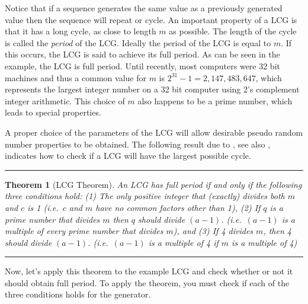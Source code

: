 \documentclass[
]{book}
\newtheorem{theorem}{Theorem}[chapter]
\theoremstyle{definition}
\theoremstyle{definition}
\theoremstyle{definition}
\theoremstyle{definition}
\theoremstyle{remark}
\begin{document}
Notice that if a sequence generates the same value as a previously
generated value then the sequence will repeat or cycle. An important
property of a LCG is that it has a long cycle, as close to length \(m\) as
possible. The length of the cycle is called the \emph{period} of the LCG.
Ideally the period of the LCG is equal to \(m\). If this occurs, the LCG
is said to achieve its full period. As can be seen in the example, the
LCG is full period. Until recently, most computers were 32 bit machines
and thus a common value for \(m\) is \(2^{31} - 1 = 2,147,483,647\), which
represents the largest integer number on a 32 bit computer using 2's
complement integer arithmetic. This choice of \(m\) also happens to be a
prime number, which leads to special properties.

A proper choice of the parameters of the LCG will allow desirable pseudo
random number properties to be obtained. The following result due to
\citep{hull1962random}, see also \citep{law2007simulation}, indicates how to check
if a LCG will have the largest possible cycle.

\begin{center}\rule{0.5\linewidth}{0.5pt}\end{center}

\begin{theorem}[LCG Theorem]
\protect\hypertarget{thm:LCGThm}{}{\label{thm:LCGThm} {} }An LCG has full period if and only if the following three conditions hold: (1) The only positive integer that (exactly) divides both \(m\) and \(c\) is 1 (i.e.~\(c\) and \(m\) have no common factors other than 1), (2) If \(q\) is a prime number that divides \(m\) then \(q\) should divide \((a-1)\). (i.e.~\((a-1)\) is a multiple of every prime number that divides \(m\)), and (3) If 4 divides \(m\), then 4 should divide \((a-1)\). (i.e.~\((a-1)\) is a multiple of 4 if \(m\) is a multiple of 4)
\end{theorem}

\begin{center}\rule{0.5\linewidth}{0.5pt}\end{center}

Now, let's apply this theorem to the example LCG and check whether or
not it should obtain full period. To apply the theorem, you must check if each of the three conditions
holds for the generator.
\end{document}
